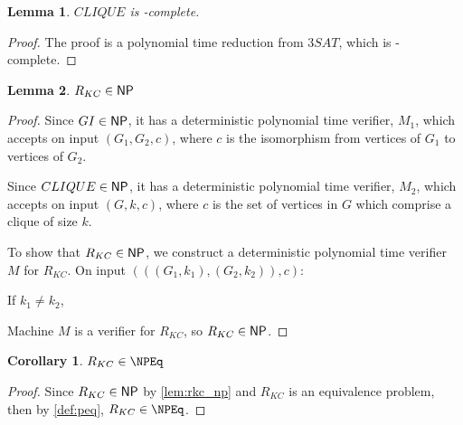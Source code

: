 \documentclass{article}
\newtheorem{lemma}{Lemma}%
\newtheorem{corollary}{Corollary}%
\theoremstyle{definition}
\begin{document}
\begin{lemma}$CLIQUE$ is \NP-complete.\end{lemma}
\begin{proof}
  The proof is a polynomial time reduction from $3SAT$, which is \NP-complete.
\end{proof}

\begin{lemma}\label{lem:rkc_np}$R_{KC}\in{\ensuremath{\mathsf{NP}}}$\end{lemma}
\begin{proof}
  Since $GI\in{\ensuremath{\mathsf{NP}}}$, it has a deterministic polynomial time verifier, $M_1$,
  which accepts on input $(G_1, G_2, c)$, where $c$ is the isomorphism from
  vertices of $G_1$ to vertices of $G_2$.

  Since $CLIQUE\in{\ensuremath{\mathsf{NP}}}$, it has a deterministic polynomial time verifier, $M_2$,
  which accepts on input $(G, k, c)$, where $c$ is the set of vertices in $G$
  which comprise a clique of size $k$.

  To show that $R_{KC}\in{\ensuremath{\mathsf{NP}}}$, we construct a deterministic polynomial time
  verifier $M$ for $R_{KC}$. On input $(((G_1, k_1), (G_2, k_2)), c)$:\\
  \begin{algorithm}[H]
    If $k_1\neq k_2$, \REJECT\;
  \end{algorithm}
  
  Machine $M$ is a verifier for $R_{KC}$, so $R_{KC}\in{\ensuremath{\mathsf{NP}}}$.
\end{proof}

\begin{corollary}\label{cor:rkc_npeq}$R_{KC}\in\NPEq$\end{corollary}
\begin{proof}
  Since $R_{KC}\in{\ensuremath{\mathsf{NP}}}$ by \autoref{lem:rkc_np} and $R_{KC}$ is an equivalence
  problem, then by \autoref{def:peq}, $R_{KC}\in\NPEq$.
\end{proof}
\end{document}
